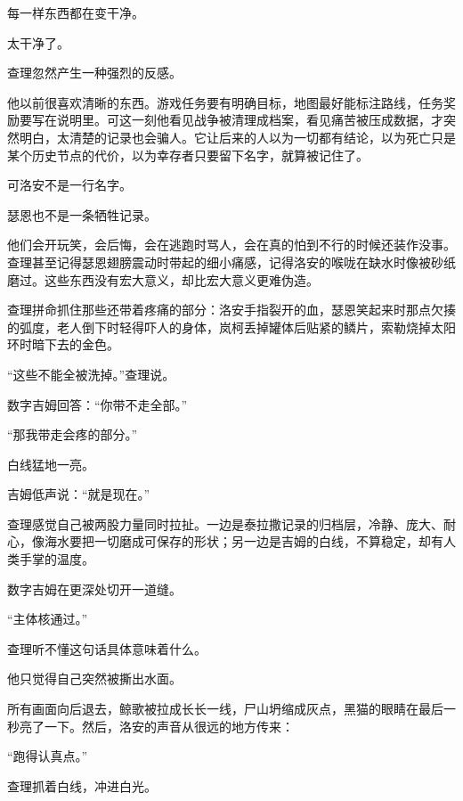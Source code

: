 每一样东西都在变干净。

太干净了。

查理忽然产生一种强烈的反感。

他以前很喜欢清晰的东西。游戏任务要有明确目标，地图最好能标注路线，任务奖励要写在说明里。可这一刻他看见战争被清理成档案，看见痛苦被压成数据，才突然明白，太清楚的记录也会骗人。它让后来的人以为一切都有结论，以为死亡只是某个历史节点的代价，以为幸存者只要留下名字，就算被记住了。

可洛安不是一行名字。

瑟恩也不是一条牺牲记录。

他们会开玩笑，会后悔，会在逃跑时骂人，会在真的怕到不行的时候还装作没事。查理甚至记得瑟恩翅膀震动时带起的细小痛感，记得洛安的喉咙在缺水时像被砂纸磨过。这些东西没有宏大意义，却比宏大意义更难伪造。

查理拼命抓住那些还带着疼痛的部分：洛安手指裂开的血，瑟恩笑起来时那点欠揍的弧度，老人倒下时轻得吓人的身体，岚柯丢掉罐体后贴紧的鳞片，索勒烧掉太阳环时暗下去的金色。

“这些不能全被洗掉。”查理说。

数字吉姆回答：“你带不走全部。”

“那我带走会疼的部分。”

白线猛地一亮。

吉姆低声说：“就是现在。”

查理感觉自己被两股力量同时拉扯。一边是泰拉撒记录的归档层，冷静、庞大、耐心，像海水要把一切磨成可保存的形状；另一边是吉姆的白线，不算稳定，却有人类手掌的温度。

数字吉姆在更深处切开一道缝。

“主体核通过。”

查理听不懂这句话具体意味着什么。

他只觉得自己突然被撕出水面。

所有画面向后退去，鲸歌被拉成长长一线，尸山坍缩成灰点，黑猫的眼睛在最后一秒亮了一下。然后，洛安的声音从很远的地方传来：

“跑得认真点。”

查理抓着白线，冲进白光。

